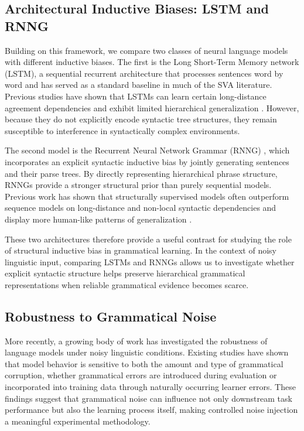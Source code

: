 \subsection{Architectural Inductive Biases: LSTM and RNNG}

Building on this framework, we compare two classes of neural language models with different inductive biases. The first is the Long Short-Term Memory network (LSTM), a sequential recurrent architecture that processes sentences word by word and has served as a standard baseline in much of the SVA literature. Previous studies have shown that LSTMs can learn certain long-distance agreement dependencies and exhibit limited hierarchical generalization \citep{linzen2016, gulordava2018}
. However, because they do not explicitly encode syntactic tree structures, they remain susceptible to interference in syntactically complex environments.

The second model is the Recurrent Neural Network Grammar (RNNG) \citep{dyer2016rnng}
, which incorporates an explicit syntactic inductive bias by jointly generating sentences and their parse trees. By directly representing hierarchical phrase structure, RNNGs provide a stronger structural prior than purely sequential models. Previous work has shown that structurally supervised models often outperform sequence models on long-distance and non-local syntactic dependencies and display more human-like patterns of generalization\citep{kuncoro2018,wilcox2020}
.

These two architectures therefore provide a useful contrast for studying the role of structural inductive bias in grammatical learning. In the context of noisy linguistic input, comparing LSTMs and RNNGs allows us to investigate whether explicit syntactic structure helps preserve hierarchical grammatical representations when reliable grammatical evidence becomes scarce.

\subsection{Robustness to Grammatical Noise}

More recently, a growing body of work has investigated the robustness of language models under noisy linguistic conditions. Existing studies have shown that model behavior is sensitive to both the amount and type of grammatical corruption, whether grammatical errors are introduced during evaluation
 or incorporated into training data through naturally occurring learner errors. These findings suggest that grammatical noise can influence not only downstream task performance but also the learning process itself, making controlled noise injection a meaningful experimental methodology.

